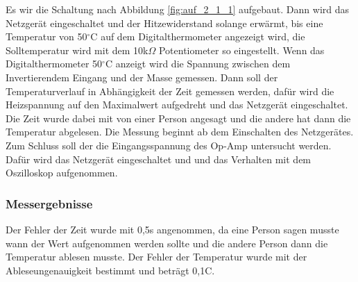 \documentclass[12pt,a4paper]{article}
\begin{document}
Es wir die Schaltung nach Abbildung \ref{fig:auf_2_1_1} aufgebaut. Dann wird das Netzgerät eingeschaltet und der Hitzewiderstand solange erwärmt, bis eine Temperatur von 50$^\circ$C auf dem Digitalthermometer angezeigt wird, die Solltemperatur wird mit dem 10k$\Omega$ Potentiometer so eingestellt. Wenn das Digitalthermometer 50$^\circ$C anzeigt wird die Spannung zwischen dem Invertierendem Eingang und der Masse gemessen. Dann soll der Temperaturverlauf in Abhängigkeit der Zeit gemessen werden, dafür wird die Heizspannung auf den Maximalwert aufgedreht und das Netzgerät eingeschaltet. Die Zeit wurde dabei mit von einer Person angesagt und die andere hat dann die Temperatur abgelesen. Die Messung beginnt ab dem Einschalten des Netzgerätes. Zum Schluss soll der die Eingangsspannung des Op-Amp untersucht werden. Dafür wird das Netzgerät eingeschaltet und und das Verhalten mit dem Oszilloskop aufgenommen.

\subsubsection*{Messergebnisse}

Der Fehler der Zeit wurde mit 0,5s angenommen, da eine Person sagen musste wann der Wert aufgenommen werden sollte und die andere Person dann die Temperatur ablesen musste. Der Fehler der Temperatur wurde mit der Ableseungenauigkeit bestimmt und beträgt 0,1C.
\end{document}
